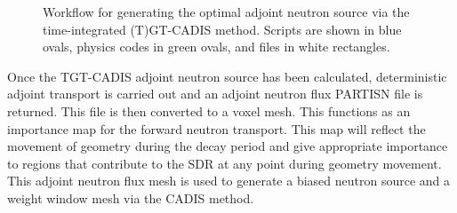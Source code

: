 \begin{figure}
\begin{tikzpicture}[every text node part/.style={align=center}]
        \end{tikzpicture}

	\caption [Workflow to generate TGT-CADIS adjoint neutron source]
	{Workflow for generating the optimal
	adjoint neutron source via the time-integrated (T)GT-CADIS method.  Scripts are shown in
	blue ovals, physics codes in green ovals, and files in white
	rectangles.\label{fig:gen_q_n_+}}
\end{figure}


Once the TGT-CADIS adjoint neutron source has been calculated, deterministic
adjoint transport is carried out and an adjoint neutron flux PARTISN file is
returned.  This file is then converted to a voxel mesh.
This functions as an importance map for the forward neutron transport.
This map will reflect the movement of geometry during the decay period and give
appropriate importance to regions that contribute to the SDR at any point
during geometry movement.
This adjoint neutron flux mesh is used to generate a biased neutron source and a 
weight window mesh via the CADIS method.

